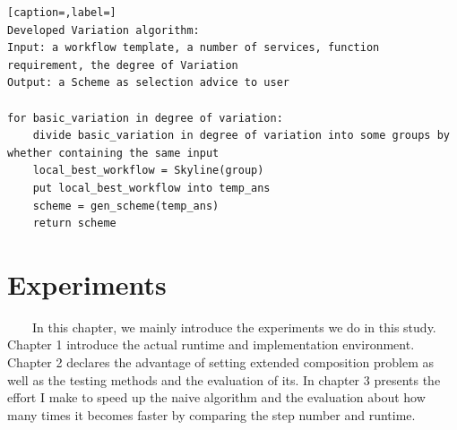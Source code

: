 \documentclass[senior,final,11pt]{iscs-thesis}
\begin{document}
 \begin{lstlisting}[caption=,label=]
Developed Variation algorithm:
Input: a workflow template, a number of services, function requirement, the degree of Variation
Output: a Scheme as selection advice to user

for basic_variation in degree of variation:
	divide basic_variation in degree of variation into some groups by whether containing the same input
	local_best_workflow = Skyline(group)
	put local_best_workflow into temp_ans
	scheme = gen_scheme(temp_ans)
	return scheme
\end{lstlisting}






\chapter{Experiments}
~~~~In this chapter, we mainly introduce the experiments we do in this study.
Chapter 1 introduce the actual runtime and implementation environment.
Chapter 2 declares the advantage of setting extended composition problem as well as the testing methods and the evaluation of its.
In chapter 3 presents the effort I make to speed up the naive algorithm and the evaluation about how many times it becomes faster by comparing the step number and runtime.
\end{document}
